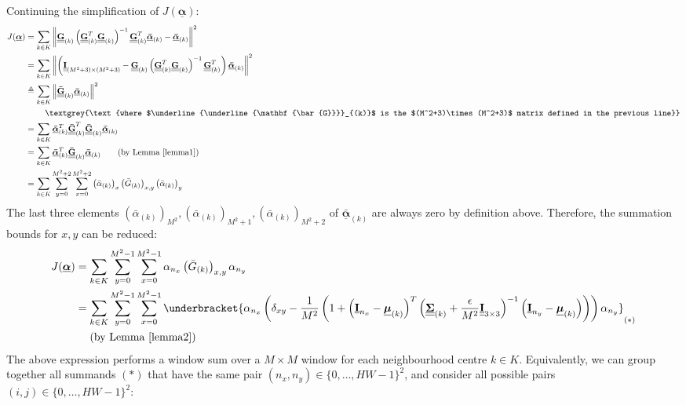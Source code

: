 \documentclass{article}
\def\vt#1{\underline{\mathbf{#1}}}
\def\vts#1{\underline{\boldsymbol{#1}}}
\def\mt#1{\underline{\underline{\mathbf{#1}}}}
\def\mts#1{\underline{\underline{\boldsymbol{#1}}}}
\begin{document}
Continuing the simplification of $J(\vts\alpha)$:
\begin{align*}
    J(\vts\alpha) &=  \sum_{k\in K} \left\| \mt G_{(k)}\left(\mt G_{(k)}^T \mt G_{(k)} \right)^{-1} \mt G_{(k)}^T \vts{\bar{\alpha}}_{(k)}  - \vts{\bar{\alpha}}_{(k)} \right\|^2\\
    &=  \sum_{k\in K} \left\| \left(\mt I_{(M^2+3)\times(M^2+3)} -  \mt G_{(k)}\left(\mt G_{(k)}^T \mt G_{(k)} \right)^{-1} \mt G_{(k)}^T \right) \vts{\bar{\alpha}}_{(k)}   \right\|^2\\
    &\triangleq  \sum_{k\in K} \left\| \mt{\bar{G}}_{(k)} \vts{\bar{\alpha}}_{(k)}   \right\|^2\\
    &\quad\quad\ \textgrey{\text{where $\mt{\bar{G}}_{(k)}$ is the $(M^2+3)\times(M^2+3)$ matrix defined in the previous line}}\\
    &= \sum_{k\in K} \vts{\bar{\alpha}}_{(k)}^T \mt{\bar{G}}_{(k)}^T \mt{\bar{G}}_{(k)} \vts{\bar{\alpha}}_{(k)}\\
    &= \sum_{k\in K} \vts{\bar{\alpha}}_{(k)}^T  \mt{\bar{G}}_{(k)} \vts{\bar{\alpha}}_{(k)} \qquad\text{(by Lemma \ref{lemma1})}\\
    &= \sum_{k\in K} \sum_{y=0}^{M^2+2} \sum_{x=0}^{M^2+2} \left({\bar{\alpha}}_{(k)}\right)_x  \left({\bar{G}}_{(k)}\right)_{x,y} \left({\bar{\alpha}}_{(k)}\right)_y
\end{align*}
The last three elements $\left({\bar{\alpha}}_{(k)}\right)_{M^2}, \left({\bar{\alpha}}_{(k)}\right)_{M^2+1}, \left({\bar{\alpha}}_{(k)}\right)_{M^2+2}$ of $\vts{\bar{\alpha}}_{(k)}$ are always zero by definition above. Therefore, the summation bounds for $x,y$ can be reduced: %
\begin{align*}
    J(\vts\alpha) &= \sum_{k\in K} \sum_{y=0}^{M^2-1} \sum_{x=0}^{M^2-1} \alpha_{n_x}  \left({\bar{G}}_{(k)}\right)_{x,y} \alpha_{n_y}\\
    &= \sum_{k\in K} \sum_{y=0}^{M^2-1} \sum_{x=0}^{M^2-1} \underbracket{\alpha_{n_x}  \left( \delta_{xy} - \frac1{M^2}\left(1 + \left(\vt{I}_{n_x} - \vts \mu_{(k)}\right)^T \left(\mts \Sigma_{(k)} + \frac\epsilon{M^2} \mt{I}_{3\times 3}\right)^{-1} \left(\vt{I}_{n_y} - \vts \mu_{(k)}\right) \right) \right) \alpha_{n_y}}_{(*)}\\
    &\quad\ \text{(by Lemma \ref{lemma2})}
\end{align*}
The above expression performs a window sum over a $M\times M$ window for each neighbourhood centre $k\in K$. Equivalently, we can group together all summands $(*)$ that have the same pair $(n_x,n_y)\in\{0,\dots,HW-1\}^2$, and consider all possible pairs $(i,j)\in\{0,\dots,HW-1\}^2$:
\end{document}
